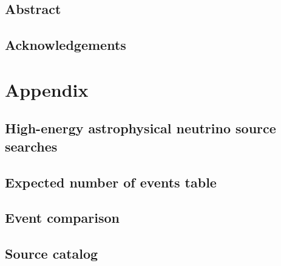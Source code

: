 \documentclass[oneside, letterpaper, 10pt, oldfontcommands]{memoir}
\begin{document}
\frontmatter

\thetitlepage
\cleardoublepage
\setcounter{page}{1}

\section{Abstract}
\uwabstract
\cleardoublepage

\section{Acknowledgements}


\clearpage

\tableofcontents\clearpage

\mainmatter













\clearpage
\newpage
\appendix

\chapter{Appendix}
\begingroup
\graphicspath{{results/HESE_Final_Paper/}}
\section{High-energy astrophysical neutrino source searches\label{sec:sources}}

\section{Expected number of events table\label{sec:events_table}}

\section{Event comparison\label{sec:comparison}}

\section{Source catalog\label{sec:source_catalog}}

\end{document}
